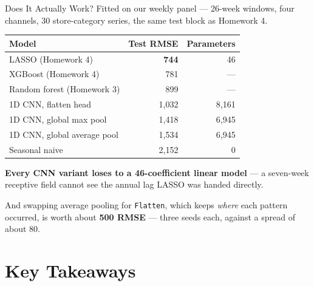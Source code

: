 \documentclass[aspectratio=169, 11pt]{beamer}
\begin{document}
\begin{frame}{Does It Actually Work?}
  Fitted on our weekly panel --- 26-week windows, four channels, 30 store-category series, the
  same test block as Homework 4.
  \begin{center}
    {\small
    \begin{tabular}{lrr}
      \toprule
      \textbf{Model} & \textbf{Test RMSE} & \textbf{Parameters} \\
      \midrule
      LASSO (Homework 4) & \textbf{744} & 46 \\
      XGBoost (Homework 4) & 781 & --- \\
      Random forest (Homework 3) & 899 & --- \\
      \midrule
      1D CNN, flatten head & 1{,}032 & 8{,}161 \\
      1D CNN, global max pool & 1{,}418 & 6{,}945 \\
      1D CNN, global average pool & 1{,}534 & 6{,}945 \\
      \midrule
      Seasonal naive & 2{,}152 & 0 \\
      \bottomrule
    \end{tabular}
    }
  \end{center}

  \vspace{-0.2cm}
  \textbf{Every CNN variant loses to a 46-coefficient linear model} --- a seven-week receptive
  field cannot see the annual lag LASSO was handed directly.

  \vspace{0.05cm}
  And swapping average pooling for \texttt{Flatten}, which keeps \emph{where} each pattern
  occurred, is worth about \textbf{500 RMSE} --- three seeds each, against a spread of about 80.
\end{frame}

\section{Key Takeaways}

\end{document}
